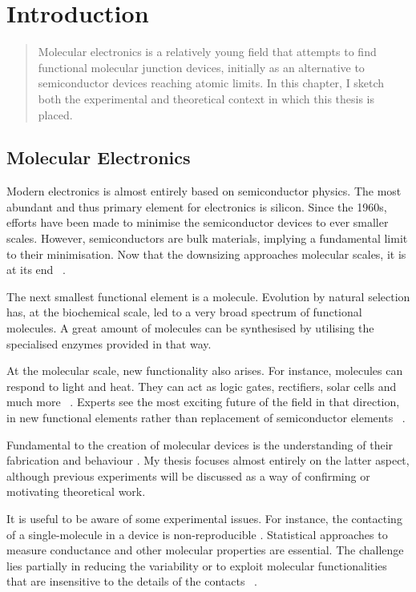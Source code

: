 \chapter{Introduction}
\label{ch:chapter_1}
 
\begin{abstract}
Molecular electronics is a relatively young field that attempts to find functional molecular junction devices, initially as an alternative to semiconductor devices reaching atomic limits. In this chapter, I sketch both the experimental and theoretical context in which this thesis is placed.
\end{abstract}

\newpage
\section{Molecular Electronics}
Modern electronics is almost entirely based on semiconductor physics. The most abundant and thus primary element for electronics is silicon. Since the 1960s, efforts have been made to minimise the semiconductor devices to ever smaller scales. However, semiconductors are bulk materials, implying a fundamental limit to their minimisation. Now that the downsizing approaches molecular scales, it is at its end ~\cite{seldenthuis}.

The next smallest functional element is a molecule. Evolution by natural selection has, at the biochemical scale, led to a very broad spectrum of functional molecules. A great amount of molecules can be synthesised by utilising the specialised enzymes provided in that way.

At the molecular scale, new functionality also arises. For instance, molecules can respond to light and heat. They can act as logic gates, rectifiers, solar cells and much more ~\cite{perrin}. Experts see the most exciting future of the field in that direction, in new functional elements rather than replacement of semiconductor elements ~\cite{visions}.

Fundamental to the creation of molecular devices is the understanding of their fabrication and behaviour . My thesis focuses almost entirely on the latter aspect, although previous experiments will be discussed as a way of confirming or motivating theoretical work.

It is useful to be aware of some experimental issues. For instance, the contacting of a single-molecule in a device is non-reproducible . Statistical approaches to measure conductance and other molecular properties are essential. The challenge lies partially in reducing the variability or to exploit molecular functionalities that are insensitive to the details of the contacts ~\cite{visions}.

